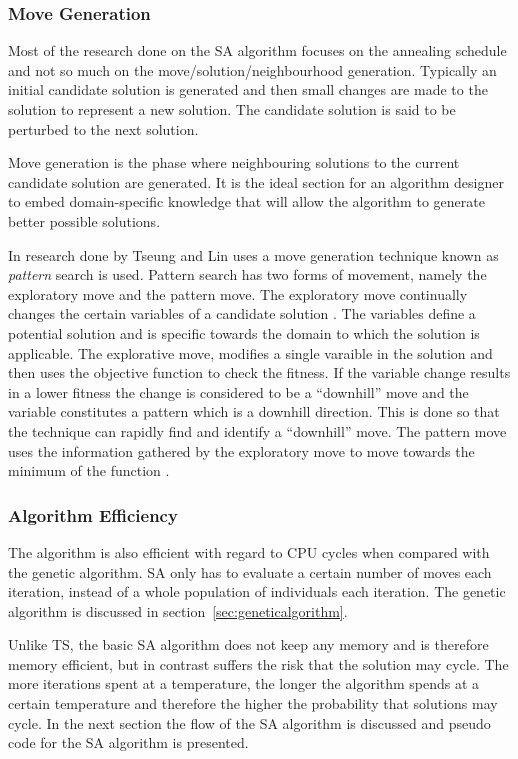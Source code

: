 \subsubsection{Move Generation}
Most of the research done on the \gls{SA} algorithm focuses on the annealing schedule and not so much on the move/solution/neighbourhood generation. Typically an initial candidate solution is generated and then small changes are made to the solution to represent a new solution. The candidate solution is said to be perturbed to the next solution.

Move generation is the phase where neighbouring solutions to the current candidate solution are generated. It is the ideal section for an algorithm designer to embed domain-specific knowledge that will allow the algorithm to generate better possible solutions.

In research done by Tseung and Lin \cite{CurveFittingSA} uses a move generation technique known as \emph{pattern} search is used. Pattern search has two forms of movement, namely the exploratory move and the pattern move. The exploratory move continually changes the certain variables of a candidate solution \cite{CurveFittingSA}. The variables define a potential solution and is specific towards the domain to which the solution is applicable. The explorative move, modifies a single varaible in the solution and then uses the objective function to check the fitness. If the variable change results in a lower fitness the change is considered to be a ``downhill'' move and the variable constitutes a pattern which is a downhill direction. This is done so that the technique can rapidly find and identify a ``downhill'' move. The pattern move uses the information gathered by the exploratory move to move towards the minimum of the function \cite{CurveFittingSA}.
\subsubsection{Algorithm Efficiency}
The algorithm is also efficient with regard to CPU cycles when compared with the genetic algorithm. \gls{SA} only has to evaluate a certain number of moves each iteration, instead of a whole population of individuals each iteration. The genetic algorithm is discussed in section~\ref{sec:geneticalgorithm}.

Unlike \gls{TS}, the basic \gls{SA} algorithm does not keep any memory and is therefore memory efficient, but in contrast suffers the risk that the solution may cycle. The more iterations spent at a temperature, the longer the algorithm spends at a certain temperature and therefore the higher the probability that solutions may cycle. In the next section the flow of the \gls{SA} algorithm is discussed and pseudo code for the \gls{SA} algorithm is presented.

